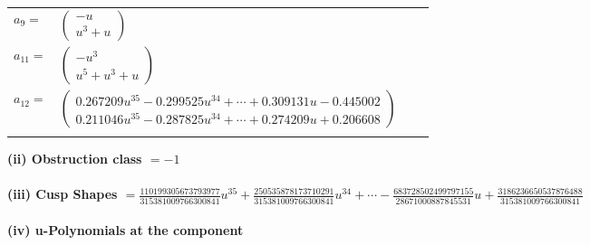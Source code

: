 \documentclass[1p]{elsarticle_modified}
\theoremstyle{definition}
\begin{document}
\begin{tabular}{m{7pt} m{180pt} m{7pt} m{180pt} }
\flushright $a_{9}=$&$\begin{pmatrix}- u\\u^3+u\end{pmatrix}$ \\
\flushright $a_{11}=$&$\begin{pmatrix}- u^3\\u^5+u^3+u\end{pmatrix}$ \\
\flushright $a_{12}=$&$\begin{pmatrix}0.267209 u^{35}-0.299525 u^{34}+\cdots+0.309131 u-0.445002\\0.211046 u^{35}-0.287825 u^{34}+\cdots+0.274209 u+0.206608\end{pmatrix}$\\&\end{tabular}
\flushleft \textbf{(ii) Obstruction class $= -1$}\\~\\
\flushleft \textbf{(iii) Cusp Shapes $= \frac{110199305673793977}{315381009766300841} u^{35}+\frac{250535878173710291}{315381009766300841} u^{34}+\cdots-\frac{683728502499797155}{28671000887845531} u+\frac{3186236650537876488}{315381009766300841}$}\\~\\
\newpage\renewcommand{\arraystretch}{1}
\flushleft \textbf{(iv) u-Polynomials at the component}\newline \\
\end{document}
